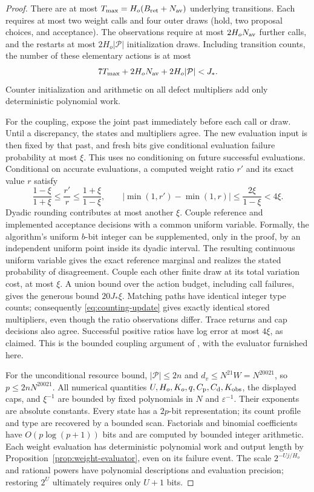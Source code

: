 \begin{proof}
There are at most $T_{\max}=H_o(B_{\rm ret}+N_{\rm av})$
underlying transitions.  Each requires at most two weight calls and
four outer draws (hold, two proposal choices, and acceptance).
The observations require at most $2H_oN_{\rm av}$ further calls,
and the restarts at most $2H_o|\mathcal P|$ initialization draws.
Including transition counts, the number of these elementary actions
is at most
\[
 7T_{\max}+2H_oN_{\rm av}+2H_o|\mathcal P|<J_*.
\]
Counter initialization and arithmetic on all defect multipliers add
only deterministic polynomial work.

For the coupling, expose the joint past immediately before each
call or draw.  Until a discrepancy, the states and multipliers agree.
The new evaluation input is then fixed by that past, and fresh bits
give conditional evaluation failure probability at most $\xi$.
This uses no conditioning on future successful evaluations.
Conditional on accurate evaluations, a computed weight ratio $r'$
and its exact value $r$ satisfy
\[
 \frac{1-\xi}{1+\xi}\leq\frac{r'}r
       \leq\frac{1+\xi}{1-\xi},\qquad
 |\min(1,r')-\min(1,r)|\leq\frac{2\xi}{1-\xi}<4\xi.
\]
Dyadic rounding contributes at most another $\xi$.
Couple reference and implemented acceptance decisions with a common
uniform variable.  Formally, the algorithm's uniform $b$-bit integer
can be supplemented, only in the proof, by an independent uniform
point inside its dyadic interval.  The resulting continuous uniform
variable gives the exact reference marginal and realizes the stated
probability of disagreement.  Couple each other finite draw at its
total variation cost, at most $\xi$.  A union bound over the action
budget, including call failures, gives the generous bound $20J_*\xi$.
Matching paths have identical integer type counts; consequently
\eqref{eq:counting-update} gives exactly identical stored multipliers,
even though the ratio observations differ.  Trace returns and cap
decisions also agree.  Successful positive ratios have log error at
most $4\xi$, as claimed.  This is the bounded coupling argument of
\cite[Lemma~7.3 and Section~7.3]{CB}, with the evaluator furnished here.

For the unconditional resource bound, $|\mathcal P|\leq2n$ and
$d_v\leq N^{21}W=N^{20021}$, so $p\leq2nN^{20021}$.
All numerical quantities $U,H_o,K_o,q,C_{\rm p},C_{\rm d},K_{\rm obs}$,
the displayed caps, and $\xi^{-1}$ are bounded by fixed polynomials
in $N$ and $\varepsilon^{-1}$.  Their exponents are absolute constants.
Every state has a $2p$-bit representation; its count profile and type
are recovered by a bounded scan.  Factorials and binomial coefficients
have $O(p\log(p+1))$ bits and are computed by bounded integer arithmetic.
Each weight evaluation has deterministic polynomial work and output
length by Proposition~\ref{prop:weight-evaluator}, even on its failure
event.  The scale $2^{-Uj/H_o}$ and rational powers have polynomial
descriptions and evaluation precision; restoring $2^U$ ultimately
requires only $U+1$ bits.


\end{proof}
